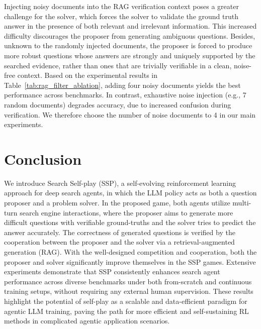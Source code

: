 \documentclass[10pt, a4paper, logo]{googledeepmind} %
\begin{document}
Injecting noisy documents into the RAG verification context poses a greater challenge for the solver, which forces the solver to validate the ground truth answer in the presence of both relevant and irrelevant information. This increased difficulty discourages the proposer from generating ambiguous questions.  Besides, unknown to the randomly injected documents, the proposer is forced to produce more robust questions whose answers are strongly and uniquely supported by the searched evidence, rather than ones that are trivially verifiable in a clean, noise-free context. Based on the experimental results in Table~\ref{tab:rag_filter_ablation}, adding four noisy documents yields the best performance across benchmarks. In contrast, exhaustive noise injection (e.g., 7 random documents) degrades accuracy, due to increased confusion during verification. We therefore choose the number of noise documents to 4 in our main experiments.

\section{Conclusion}

We introduce Search Self-play (SSP), a self-evolving reinforcement learning approach for deep search agents, in which the LLM policy acts as both a question proposer and a problem solver. In the proposed game, both agents utilize multi-turn search engine interactions, where the proposer aims to generate more difficult questions with verifiable ground-truths and the solver tries to predict the answer accurately. The correctness of generated questions is verified by the cooperation between the proposer and the solver via a retrieval-augmented generation (RAG). 
With the well-designed competition and cooperation, both the proposer and solver significantly improve themselves in the SSP games. Extensive experiments demonstrate that SSP consistently enhances search agent performance across diverse benchmarks under both from-scratch and continuous training setups, without requiring any external human supervision. These results highlight the potential of self-play as a scalable and data-efficient paradigm for agentic LLM training, paving the path for more efficient and self-sustaining RL methods in complicated agentic application scenarios.
\end{document}
